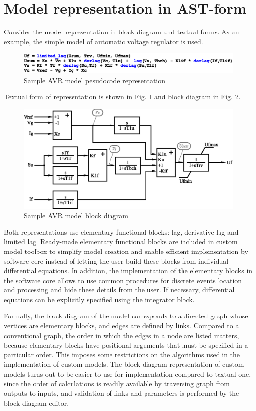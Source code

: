 \documentclass[lettersize,journal]{IEEEtran}
\begin{document}
\section{Model representation in AST-form}
Consider the model representation in block diagram and textual forms. As an example, the simple model of automatic voltage regulator is used. 
\begin{figure}[h]
	\centering
	\includegraphics[width=\columnwidth]{code.eps}
	\caption{Sample AVR model pesudocode representation}
	\label{fig_avrcode}
\end{figure}
Textual form of representation is shown in Fig. \ref{fig_avrcode} and block diagram in Fig. \ref{fig_avr}.
\begin{figure}[h]
	\centering
	\includegraphics[width=\columnwidth]{avr.eps}
	\caption{Sample AVR model block diagram}
	\label{fig_avr}
\end{figure}

Both representations use elementary functional blocks: lag, derivative lag and limited lag. Ready-made elementary functional
blocks are included in custom model toolbox to simplify model creation and enable efficient implementation by software core 
instead of letting the user build these blocks from individual differential equations.
In addition, the implementation of the elementary blocks in the software core allows to use common procedures for discrete events 
location and processing and hide these details from the user. 
If necessary, differential equations can be explicitly specified using the integrator block.

Formally, the block diagram of the model corresponds to a directed graph whose vertices are elementary blocks, and
edges are defined by links. Compared to a conventional graph, the order in which the edges in a node are listed matters,
because elementary blocks have positional arguments that must be specified in a particular order. This imposes some restrictions
on the algorithms used in the implementation of custom models. The block diagram representation of custom models
turns out to be easier to use for implementation compared to textual one, since the order of calculations is readily
available by traversing graph from outputs to inputs, and validation of links and parameters is performed by the 
block diagram editor.
\end{document}
